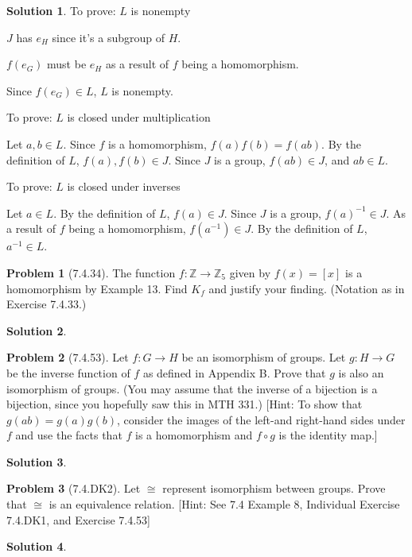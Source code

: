 \documentclass[12pt]{article}
\theoremstyle{definition}
\newtheorem*{prob}{Problem}
\newtheorem*{soln}{Solution}
\newcommand{\ZZ}{{\mathbb{Z}}}
\begin{document}
\begin{soln}

To prove: $L$ is nonempty

$J$ has $e_H$ since it's a subgroup of $H$.

$f(e_G)$ must be $e_H$ as a result of $f$ being a homomorphism.

Since $f(e_G)\in L$, $L$ is nonempty.

To prove: $L$ is closed under multiplication

Let $a, b\in L$.  Since $f$ is a homomorphism, $f(a)f(b)=f(ab)$.
By the definition of $L$, $f(a), f(b)\in J$.
Since $J$ is a group, $f(ab)\in J$, and $ab\in L$.

To prove: $L$ is closed under inverses

Let $a\in L$.
By the definition of $L$, $f(a)\in J$.
Since $J$ is a group, $f(a)^{-1}\in J$.
As a result of $f$ being a homomorphism, $f(a^{-1})\in J$.
By the definition of $L$, $a^{-1}\in L$.

\end{soln}

\begin{prob}[7.4.34]
The function $f:\ZZ \to \ZZ_5$ given by $f(x) = [x]$ is a homomorphism by Example 13. 
Find $K_f$ 
and justify your finding. (Notation as in Exercise 7.4.33.)
\end{prob}

\begin{soln}

\end{soln}




\begin{prob}[7.4.53]
Let $f:G \to H$ be an isomorphism of  groups. Let $g:H \to G$ 
be the inverse function of  $f$ as defined in Appendix B. 
Prove that $g$ is also an isomorphism of  groups. 
(You may assume that the inverse of a bijection is a bijection, since
you hopefully saw this in MTH 331.)
[Hint: To show that $g(ab) = g(a)g(b)$, 
consider the images of  the left-and right-hand sides under $f$ and use the facts 
that $f$ is a homomorphism and $f \circ g$ is the identity map.]
\end{prob}

\begin{soln}

\end{soln}

\begin{prob}[7.4.DK2] Let $\cong$ represent isomorphism between groups.
Prove that $\cong$ is an equivalence relation.
[Hint: See 7.4 Example 8, Individual Exercise 7.4.DK1, and Exercise 7.4.53]
\end{prob}

\begin{soln}


\end{soln}
\end{document}
